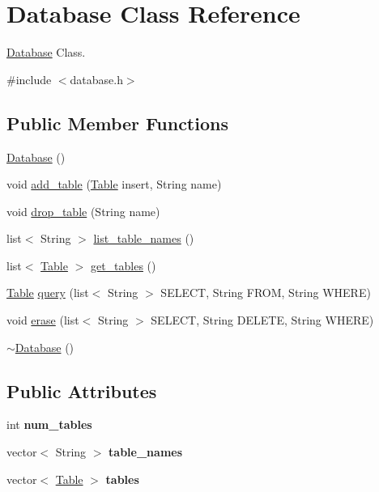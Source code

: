 \hypertarget{class_database}{\section{Database Class Reference}
\label{class_database}
}


\hyperlink{class_database}{Database} Class.  




{\ttfamily \#include $<$database.\-h$>$}

\subsection*{Public Member Functions}
\begin{DoxyCompactItemize}
\item 
\hyperlink{class_database_a4703c80e6969d33565ea340f768fdadf}{Database} ()
\item 
void \hyperlink{class_database_ac6e9807456521575ae54e5d4314af995}{add\-\_\-table} (\hyperlink{class_table}{Table} insert, String name)
\item 
void \hyperlink{class_database_a7c85efbb112bdabd4190abdb9005b39a}{drop\-\_\-table} (String name)
\item 
list$<$ String $>$ \hyperlink{class_database_a30f10d4e72d45b9657916e1c27cd2ca1}{list\-\_\-table\-\_\-names} ()
\item 
list$<$ \hyperlink{class_table}{Table} $>$ \hyperlink{class_database_afcaf9633b16fabe374e914ceaf8be112}{get\-\_\-tables} ()
\item 
\hyperlink{class_table}{Table} \hyperlink{class_database_a84d18403d21da42baa9eb26eb8ebad6a}{query} (list$<$ String $>$ S\-E\-L\-E\-C\-T, String F\-R\-O\-M, String W\-H\-E\-R\-E)
\item 
void \hyperlink{class_database_ab5d75308185ae2bb66423b7584054b0c}{erase} (list$<$ String $>$ S\-E\-L\-E\-C\-T, String D\-E\-L\-E\-T\-E, String W\-H\-E\-R\-E)
\item 
\hyperlink{class_database_a84d399a2ad58d69daab9b05330e1316d}{$\sim$\-Database} ()
\end{DoxyCompactItemize}
\subsection*{Public Attributes}
\begin{DoxyCompactItemize}
\item 
\hypertarget{class_database_aaef28adf454c153e00c7e8c22f411f01}{int {\bfseries num\-\_\-tables}}\label{class_database_aaef28adf454c153e00c7e8c22f411f01}

\item 
\hypertarget{class_database_a937bd8575bf99f1ebe401682e31dc6ab}{vector$<$ String $>$ {\bfseries table\-\_\-names}}\label{class_database_a937bd8575bf99f1ebe401682e31dc6ab}

\item 
\hypertarget{class_database_ab588b894851f665d6718089d4fd9ac05}{vector$<$ \hyperlink{class_table}{Table} $>$ {\bfseries tables}}\label{class_database_ab588b894851f665d6718089d4fd9ac05}

\end{DoxyCompactItemize}


